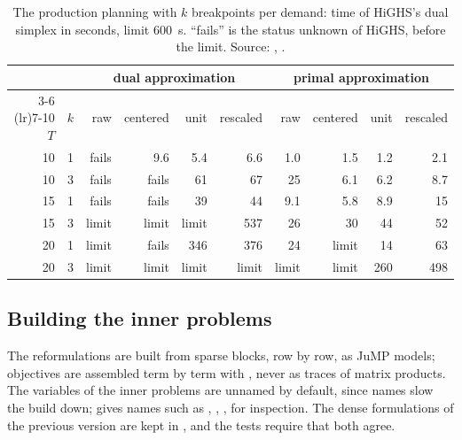\begin{table}[ht]
\centering
\caption[Scaling of the production planning]{The production planning with $k$ breakpoints per demand: time of HiGHS's dual simplex in seconds, limit 600~s.
``fails'' is the status unknown of HiGHS, before the limit.
Source: , .}
\label{tab:scaling}
\small
\setlength{\tabcolsep}{3.5pt}
\begin{tabular}{rrrrrrrrrr}
\toprule
& & \multicolumn{4}{c}{dual approximation} & \multicolumn{4}{c}{primal approximation} \\
\cmidrule(lr){3-6} \cmidrule(lr){7-10}
$T$ & $k$ & raw & centered & unit & rescaled & raw & centered & unit & rescaled \\
\midrule
10 & 1 & fails & 9.6 & 5.4 & 6.6 & 1.0 & 1.5 & 1.2 & 2.1 \\
10 & 3 & fails & fails & 61 & 67 & 25 & 6.1 & 6.2 & 8.7 \\
15 & 1 & fails & fails & 39 & 44 & 9.1 & 5.8 & 8.9 & 15 \\
15 & 3 & limit & limit & limit & 537 & 26 & 30 & 44 & 52 \\
20 & 1 & limit & fails & 346 & 376 & 24 & limit & 14 & 63 \\
20 & 3 & limit & limit & limit & limit & limit & limit & 260 & 498 \\
\bottomrule
\end{tabular}
\end{table}

\subsection{Building the inner problems}

The reformulations are built from sparse blocks, row by row, as JuMP models;
objectives are assembled term by term with , never as traces of matrix products.
The variables of the inner problems are unnamed by default, since names slow the build down;  gives names such as , \code{$\lambda$[r,b]}, ,  for inspection.
The dense formulations of the previous version are kept in , and the tests require that both agree.
